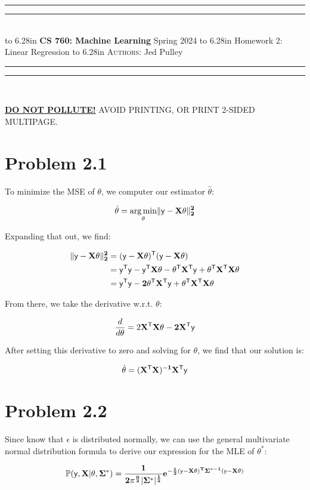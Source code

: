 \documentclass{article}
\newcommand{\lecture}[2]{
\pagestyle{myheadings}
\thispagestyle{plain}
\newpage
\noindent
\begin{center}
\rule{\textwidth}{1.6pt}\vspace*{-\baselineskip}\vspace*{2pt} %
\rule{\textwidth}{0.4pt}\\[1\baselineskip] %
\vbox{\vspace{2mm}
\hbox to 6.28in { {\bf CS 760: Machine Learning} \hfill Spring 2024 }
\vspace{4mm}
\hbox to 6.28in { {\Large \hfill #1  \hfill} }
\vspace{4mm}
\hbox to 6.28in { {\scshape Authors:}  #2 \hfill }}
\vspace{-2mm}
\rule{\textwidth}{0.4pt}\vspace*{-\baselineskip}\vspace{3.2pt} %
\rule{\textwidth}{1.6pt}\\[\baselineskip] %
\end{center}
\vspace*{4mm}
}
\begin{document}
\lecture{Homework 2: Linear Regression}{Jed Pulley}

\begin{center}
{\Large {\sf \underline{\textbf{DO NOT POLLUTE!}} AVOID PRINTING, OR PRINT 2-SIDED MULTIPAGE.}}
\end{center}

\section*{Problem 2.1}

To minimize the MSE of $\theta$, we computer our estimator $\hat{\theta}$:

\[\hat{\theta} = \underset{\theta}{\arg\min} \Vert \bf{\sf{y}}  - \bf{X}  \theta \Vert ^2_2 \]

Expanding that out, we find:

\begin{align*}
  \Vert \bf{\sf{y}}  - \bf{X}  \theta \Vert ^2_2 
  & = (\bf{\sf{y}} - \bf{X}  {\theta})^{\sf{T}}(\bf{\sf{y}} - \bf{X}  {\theta}) \\
  & = \bf{\sf{y}}^{\sf{T}}\bf{\sf{y}} - \bf{\sf{y}}^{\sf{T}}\bf{X}{\theta} - {\theta}^{\sf{T}}\bf{X}^{\sf{T}}\bf{\sf{y}} + {\theta}^{\sf{T}}\bf{X}^{\sf{T}}\bf{X}{\theta} \\
  & = \bf{\sf{y}}^{\sf{T}}\bf{\sf{y}} - 2{\theta}^{\sf{T}}\bf{X}^{\sf{T}}\bf{\sf{y}} + {\theta}^{\sf{T}}\bf{X}^{\sf{T}}\bf{X}{\theta}
\end{align*}

From there, we take the derivative w.r.t. $\theta$:

\begin{align*}
  \frac{d}{d\theta} = 2\bf{X}^{\sf{T}}\bf{X}{\theta} - 2\bf{X}^{\sf{T}}\bf{\sf{y}}
\end{align*}

After setting this derivative to zero and solving for $\theta$, we find that our solution is:

\[\hat{\theta} = (\bf{X}^{\sf{T}}\bf{X})^{-1}\bf{X}^{\sf{T}}\bf{\sf{y}}\]

\section*{Problem 2.2}

Since know that $\epsilon$ is distributed normally, we can use the general multivariate normal distribution formula to derive our expression for the MLE of $\theta^{*}$:

\begin{align*}
  \mathbb{P}(\sf{y}, \bf{X} | \theta,\Sigma^{*}) = \frac{1}{{2\pi^{\frac{n}{2}} | \Sigma^{*} |^{\frac{1}{2}} }}e^{-\frac{1}{2}(\sf{y} - \bf{X} \theta)^T\Sigma^{*-1}(\sf{y} - \bf{X} \theta)}
\end{align*}
\end{document}

